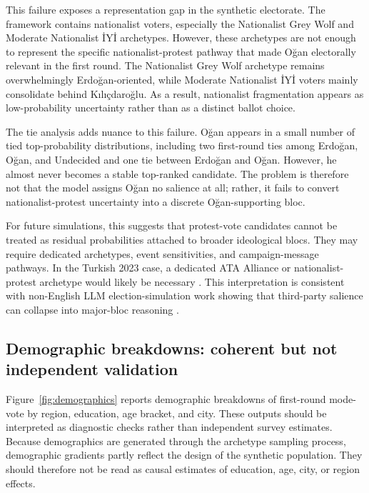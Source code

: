 \documentclass[pdflatex,sn-mathphys-num,iicol]{sn-jnl}
\begin{document}
This failure exposes a representation gap in the synthetic electorate. The framework contains nationalist voters, especially the Nationalist Grey Wolf and Moderate Nationalist İYİ archetypes. However, these archetypes are not enough to represent the specific nationalist-protest pathway that made Oğan electorally relevant in the first round. The Nationalist Grey Wolf archetype remains overwhelmingly Erdoğan-oriented, while Moderate Nationalist İYİ voters mainly consolidate behind Kılıçdaroğlu. As a result, nationalist fragmentation appears as low-probability uncertainty rather than as a distinct ballot choice.

The tie analysis adds nuance to this failure. Oğan appears in a small number of tied top-probability distributions, including two first-round ties among Erdoğan, Oğan, and Undecided and one tie between Erdoğan and Oğan. However, he almost never becomes a stable top-ranked candidate. The problem is therefore not that the model assigns Oğan no salience at all; rather, it fails to convert nationalist-protest uncertainty into a discrete Oğan-supporting bloc.

For future simulations, this suggests that protest-vote candidates cannot be treated as residual probabilities attached to broader ideological blocs. They may require dedicated archetypes, event sensitivities, and campaign-message pathways. In the Turkish 2023 case, a dedicated ATA Alliance or nationalist-protest archetype would likely be necessary \cite{gerim2025victory,karaca2024socialmedia}. This interpretation is consistent with non-English LLM election-simulation work showing that third-party salience can collapse into major-bloc reasoning \cite{kang2026dynamok}.

\subsection{Demographic breakdowns: coherent but not independent validation}\label{subsec:demographics}

Figure~\ref{fig:demographics} reports demographic breakdowns of first-round mode-vote by region, education, age bracket, and city. These outputs should be interpreted as diagnostic checks rather than independent survey estimates. Because demographics are generated through the archetype sampling process, demographic gradients partly reflect the design of the synthetic population. They should therefore not be read as causal estimates of education, age, city, or region effects.
\end{document}
